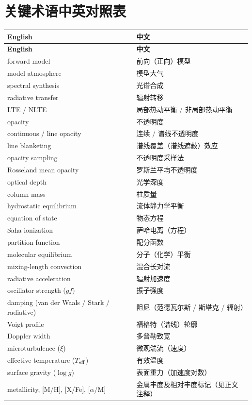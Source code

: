 \documentclass[11pt,a4paper,UTF8,fontset=fandol]{ctexart}
\begin{document}
\section*{关键术语中英对照表}
\begin{longtable}{@{}p{}p{}@{}}
\toprule
\textbf{English} & \textbf{中文} \\
\midrule
\endfirsthead
\toprule
\textbf{English} & \textbf{中文} \\
\midrule
\endhead
forward model & 前向（正向）模型 \\
model atmosphere & 模型大气 \\
spectral synthesis & 光谱合成 \\
radiative transfer & 辐射转移 \\
LTE / NLTE & 局部热动平衡 / 非局部热动平衡 \\
opacity & 不透明度 \\
continuous / line opacity & 连续 / 谱线不透明度 \\
line blanketing & 谱线覆盖（谱线遮蔽）效应 \\
opacity sampling & 不透明度采样法 \\
Rosseland mean opacity & 罗斯兰平均不透明度 \\
optical depth & 光学深度 \\
column mass & 柱质量 \\
hydrostatic equilibrium & 流体静力学平衡 \\
equation of state & 物态方程 \\
Saha ionization & 萨哈电离（方程） \\
partition function & 配分函数 \\
molecular equilibrium & 分子（化学）平衡 \\
mixing-length convection & 混合长对流 \\
radiative acceleration & 辐射加速度 \\
oscillator strength ($gf$) & 振子强度 \\
damping (van der Waals / Stark / radiative) & 阻尼（范德瓦尔斯 / 斯塔克 / 辐射） \\
Voigt profile & 福格特（谱线）轮廓 \\
Doppler width & 多普勒致宽 \\
microturbulence ($\xi$) & 微观湍流（速度） \\
effective temperature ($T_{\rm eff}$) & 有效温度 \\
surface gravity ($\log g$) & 表面重力（加速度对数） \\
metallicity, [M/H], [X/Fe], [$\alpha$/M] & 金属丰度及相对丰度标记（见正文注释） \\

\end{longtable}
\end{document}
